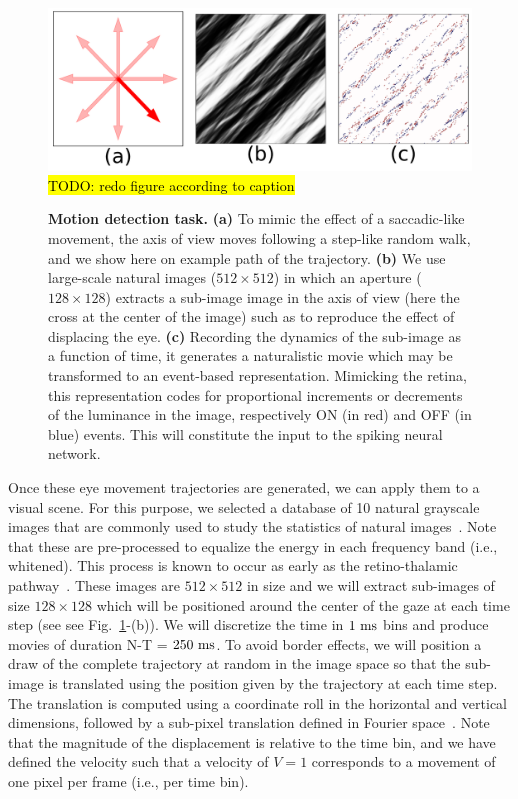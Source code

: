 \documentclass[default]{sn-jnl}%
\theoremstyle{thmstyleone}%
\theoremstyle{thmstyletwo}%
\theoremstyle{thmstylethree}%
\newcommand{\seeFig}[1]{see Fig.~\ref{fig:#1}}%
\DeclareRobustCommand{\note}[1]{{\sethlcolor{yellow}\hl{#1}}}
\begin{document}
\begin{figure}[h!]%
    \centering
    \includegraphics[width=0.95\linewidth]{figures/motion-task.pdf}
    \note{TODO: redo figure according to caption}
    \caption{
    {\bf Motion detection task.} {\bf (a)} To mimic the effect of a saccadic-like movement, the axis of view moves following a step-like random walk, and we show here on example path of the trajectory. {\bf (b)} We use large-scale natural images ($512\times512$) in which an aperture ($128\times128$) extracts a sub-image image in the axis of view (here the cross at the center of the image) such as to reproduce the effect of displacing the eye. {\bf (c)} Recording the dynamics of the sub-image as a function of time, it generates a naturalistic movie which may be transformed to an event-based representation. Mimicking the retina, this representation codes for proportional increments or decrements of the luminance in the image, respectively ON (in red) and OFF (in blue) events. This will constitute the input to the spiking neural network.}
    \label{fig:motion-task}
\end{figure}

Once these eye movement trajectories are generated, we can apply them to a visual scene. For this purpose, we selected a database of 10 natural grayscale images that are commonly used to study the statistics of natural images~\citep{olshausen 96}. Note that these are pre-processed to equalize the energy in each frequency band (i.e., whitened). This process is known to occur as early as the retino-thalamic pathway~\citep{dan 1996}. These images are $512 \times 512$ in size and we will extract sub-images of size $128 \times 128$ which will be positioned around the center of the gaze at each time step (see \seeFig{motion-task}-(b)). We will discretize the time in $1~\si{\milli\second}$ bins and produce movies of duration N-T = $250~\si{\milli\second}$. To avoid border effects, we will position a draw of the complete trajectory at random in the image space so that the sub-image is translated using the position given by the trajectory at each time step. The translation is computed using a coordinate roll in the horizontal and vertical dimensions, followed by a sub-pixel translation defined in Fourier space~\citep{Perrinet, 2015}. Note that the magnitude of the displacement is relative to the time bin, and we have defined the velocity such that a velocity of $V=1$ corresponds to a movement of one pixel per frame (i.e., per time bin).
\end{document}
